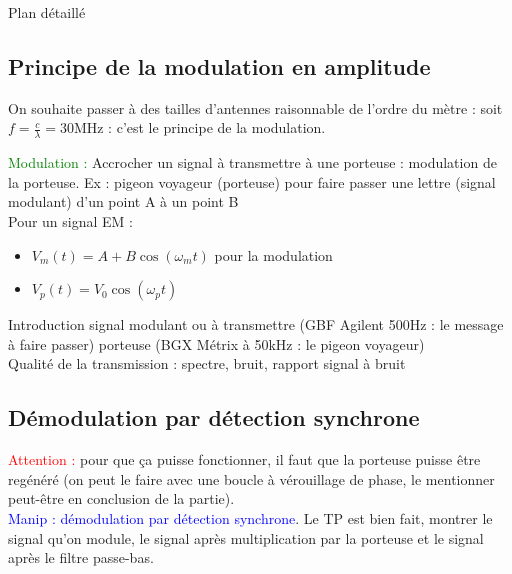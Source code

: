 \begin{reportBlock}{Plan détaillé}
\subsection{Principe de la modulation en amplitude}
On souhaite passer à des tailles d'antennes raisonnable de l'ordre du mètre : soit $f=\frac{c}{\lambda}=30$MHz : c'est le principe de la modulation.

\textcolor{green}{Modulation :} Accrocher un signal à transmettre à une porteuse : modulation de la porteuse. Ex : pigeon voyageur (porteuse) pour faire passer une lettre (signal modulant) d'un point A à un point B\\

Pour un signal EM : 
\begin{itemize}
    \item $V_m(t)=A+B\cos(\omega_mt)$ pour la modulation
    \item $V_p(t) = V_0\cos(\omega_pt)$
\end{itemize}

Introduction signal modulant ou à transmettre (GBF Agilent 500Hz : le message à faire passer) porteuse (BGX Métrix à 50kHz : le pigeon voyageur)\\

Qualité de la transmission : spectre, bruit, rapport signal à bruit

\subsection{Démodulation par détection synchrone}
\textcolor{red}{Attention :} pour que ça puisse fonctionner, il faut que la porteuse puisse être regénéré (on peut le faire avec une boucle à vérouillage de phase, le mentionner peut-être en conclusion de la partie).\\

\textcolor{blue}{Manip : démodulation par détection synchrone}. Le TP est bien fait, montrer le signal qu'on module, le signal après multiplication par la porteuse et le signal après le filtre passe-bas.



\end{reportBlock}